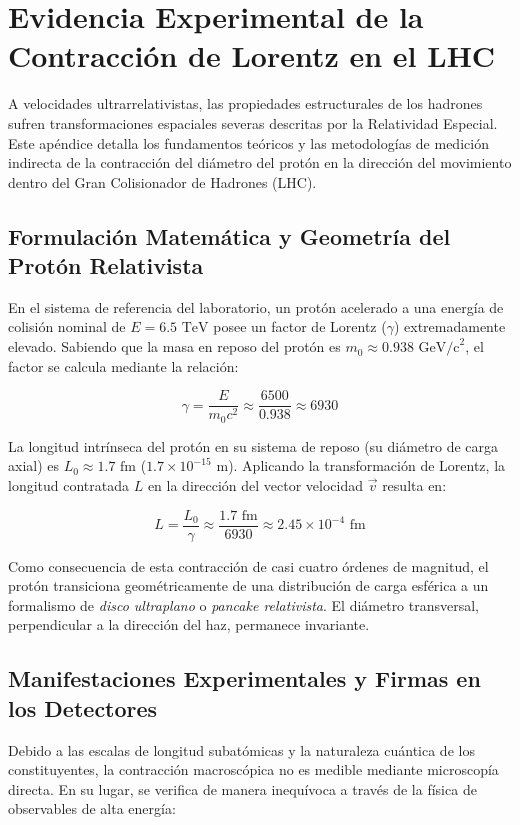 \documentclass[11pt,a4paper]{book}
\begin{document}
\section{Evidencia Experimental de la Contracción de Lorentz en el LHC}
\label{apendice:contraccion_proton}

A velocidades ultrarrelativistas, las propiedades estructurales de los hadrones sufren transformaciones espaciales severas descritas por la Relatividad Especial. Este apéndice detalla los fundamentos teóricos y las metodologías de medición indirecta de la contracción del diámetro del protón en la dirección del movimiento dentro del Gran Colisionador de Hadrones (LHC).

\subsection{Formulación Matemática y Geometría del Protón Relativista}
En el sistema de referencia del laboratorio, un protón acelerado a una energía de colisión nominal de $E = 6.5\text{ TeV}$ posee un factor de Lorentz ($\gamma$) extremadamente elevado. Sabiendo que la masa en reposo del protón es $m_0 \approx 0.938\text{ GeV/c}^2$, el factor se calcula mediante la relación:

\begin{equation}
\gamma = \frac{E}{m_0 c^2} \approx \frac{6500}{0.938} \approx 6930
\end{equation}

La longitud intrínseca del protón en su sistema de reposo (su diámetro de carga axial) es $L_0 \approx 1.7\text{ fm}$ ($1.7 \times 10^{-15}\text{ m}$). Aplicando la transformación de Lorentz, la longitud contratada $L$ en la dirección del vector velocidad $\vec{v}$ resulta en:

\begin{equation}
L = \frac{L_0}{\gamma} \approx \frac{1.7\text{ fm}}{6930} \approx 2.45 \times 10^{-4}\text{ fm}
\end{equation}

Como consecuencia de esta contracción de casi cuatro órdenes de magnitud, el protón transiciona geométricamente de una distribución de carga esférica a un formalismo de \textit{disco ultraplano} o \textit{pancake relativista}. El diámetro transversal, perpendicular a la dirección del haz, permanece invariante.

\subsection{Manifestaciones Experimentales y Firmas en los Detectores}
Debido a las escalas de longitud subatómicas y la naturaleza cuántica de los constituyentes, la contracción macroscópica no es medible mediante microscopía directa. En su lugar, se verifica de manera inequívoca a través de la física de observables de alta energía:
\end{document}
